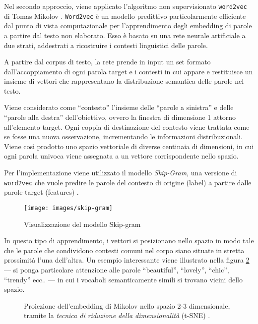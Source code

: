 Nel secondo approccio, viene applicato l'algoritmo non supervisionato \texttt{word2vec} di Tomas Mikolov  \cite{mikolov2013efficient}. 
\texttt{Word2vec} è un modello predittivo particolarmente efficiente dal punto di vista computazionale per l'apprendimento degli embedding di parole a partire dal testo non elaborato.
Esso è basato su una rete neurale artificiale a due strati, addestrati a ricostruire i contesti linguistici delle parole. 

A partire dal corpus di testo, la rete prende in input un set formato dall'accoppiamento di ogni parola target e i contesti in cui appare e restituisce un insieme di vettori che rappresentano la distribuzione semantica delle parole nel testo. 

Viene considerato come ``contesto'' l'insieme delle ``parole a sinistra'' e delle ``parole alla destra'' dell'obiettivo, ovvero la finestra di dimensione 1 attorno all'elemento target. Ogni coppia di destinazione del contesto viene trattata come se fosse una nuova osservazione, incrementando le informazioni distribuzionali. Viene così prodotto uno spazio vettoriale di diverse centinaia di dimensioni, in cui ogni parola univoca viene assegnata a un vettore corrispondente nello spazio.

Per l'implementazione viene utilizzato il modello \emph{Skip-Gram}, una versione di \texttt{word2vec} che vuole predire le parole del contesto di origine (label) a partire dalle parole target (features) \cite{FIXME}.

\begin{figure}[H]
	\centering
	{\texttt{[image: images/skip-gram]}} 
	\caption{Visualizzazione del modello Skip-gram}
	\label{fig:mikolov}
\end{figure}

In questo tipo di apprendimento, i vettori si posizionano nello spazio in modo tale che le parole che condividono contesti comuni nel corpo siano situate in stretta prossimità l'una dell'altra. Un esempio interessante viene illustrato nella figura \ref{fig:embedding1} --- si ponga particolare attenzione alle parole ``beautiful'', ``lovely'', ``chic'', ``trendy'' ecc.. --- in cui i vocaboli semanticamente simili si trovano vicini dello spazio.

\begin{figure}[H]
	\centering
	\hspace{10mm}
	
	\caption{Proiezione dell'embedding di Mikolov nello spazio 2-3 dimensionale, tramite la \emph{tecnica di riduzione della dimensionalità} (t-SNE) \cite{maaten2008visualizing}.}
	\label{fig:embedding1}
\end{figure}

